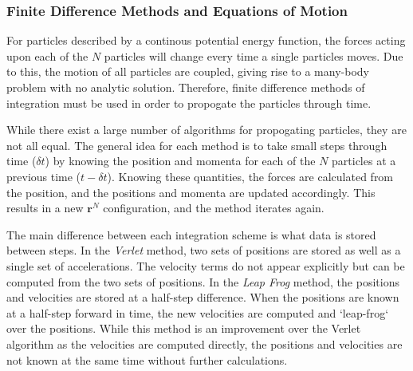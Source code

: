 \subsubsection{Finite Difference Methods and Equations of Motion}
For particles described by a continous potential energy function, the
forces acting upon each of the $N$ particles will change every time a
single particles moves. Due to this, the motion of all particles are
coupled, giving rise to a many-body problem with no analytic
solution. Therefore, finite difference methods of integration must be
used in order to propogate the particles through time.

While there exist a large number of algorithms for propogating
particles, they are not all equal. The general idea for each method is
to take small steps through time ($\delta t$) by knowing the position
and momenta for each of the $N$ particles at a previous time
($t-\delta t$). Knowing these quantities, the forces are calculated
from the position, and the positions and momenta are updated
accordingly. This results in a new $\mathbf{r}^N$ configuration, and
the method iterates again.

The main difference between each integration scheme is what data is
stored between steps. In the \textit{Verlet} method, two sets of
positions are stored as well as a single set of accelerations. The
velocity terms do not appear explicitly but can be computed from the
two sets of positions. In the \textit{Leap Frog} method, the positions
and velocities are stored at a half-step difference. When the
positions are known at a half-step forward in time, the new velocities are
computed and `leap-frog` over the positions. While this method is an
improvement over the Verlet algorithm as the velocities are computed
directly, the positions and velocities are not known at the same time
without further calculations.


